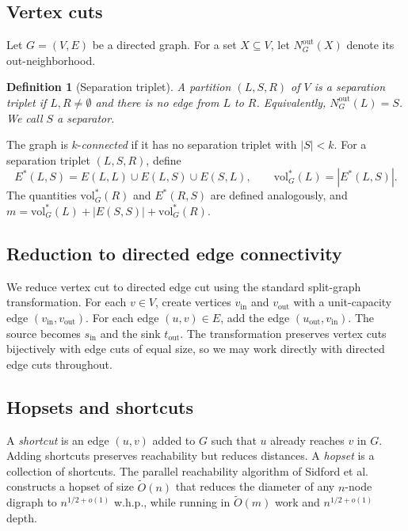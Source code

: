 \documentclass[11pt]{article}
\newtheorem{definition}[theorem]{Definition}
\theoremstyle{remark}
\newcommand{\tildeO}{\widetilde{O}}
\newcommand{\vol}{\mathrm{vol}}
\begin{document}
\subsection{Vertex cuts}
Let \(G=(V,E)\) be a directed graph. For a set \(X\subseteq V\), let \(N_G^{\mathrm{out}}(X)\) denote its out-neighborhood.

\begin{definition}[Separation triplet]
A partition \((L,S,R)\) of \(V\) is a \emph{separation triplet} if \(L,R\neq\emptyset\) and there is no edge from \(L\) to \(R\). Equivalently, \(N_G^{\mathrm{out}}(L)=S\). We call \(S\) a \emph{separator}.
\end{definition}

The graph is \(k\)-\emph{connected} if it has no separation triplet with \(|S|<k\). For a separation triplet \((L,S,R)\), define
\[
E^*(L,S) = E(L,L)\cup E(L,S)\cup E(S,L),
\qquad
\vol_G^*(L) = |E^*(L,S)|.
\]
The quantities \(\vol_G^*(R)\) and \(E^*(R,S)\) are defined analogously, and \(m=\vol_G^*(L)+|E(S,S)|+\vol_G^*(R)\).

\subsection{Reduction to directed edge connectivity}
We reduce vertex cut to directed edge cut using the standard split-graph transformation. For each \(v\in V\), create vertices \(v_{\mathrm{in}}\) and \(v_{\mathrm{out}}\) with a unit-capacity edge \((v_{\mathrm{in}},v_{\mathrm{out}})\). For each edge \((u,v)\in E\), add the edge \((u_{\mathrm{out}},v_{\mathrm{in}})\). The source becomes \(s_{\mathrm{in}}\) and the sink \(t_{\mathrm{out}}\). The transformation preserves vertex cuts bijectively with edge cuts of equal size, so we may work directly with directed edge cuts throughout.

\subsection{Hopsets and shortcuts}
A \emph{shortcut} is an edge \((u,v)\) added to \(G\) such that \(u\) already reaches \(v\) in \(G\). Adding shortcuts preserves reachability but reduces distances. A \emph{hopset} is a collection of shortcuts. The parallel reachability algorithm of Sidford et al.~\cite{Jambulapati2019ParallelRI} constructs a hopset of size \(\tildeO(n)\) that reduces the diameter of any \(n\)-node digraph to \(n^{1/2+o(1)}\) w.h.p., while running in \(\tildeO(m)\) work and \(n^{1/2+o(1)}\) depth.
\end{document}
